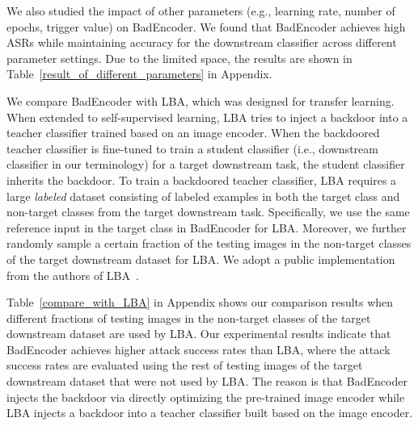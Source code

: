   We also studied the impact of other parameters (e.g., learning rate, number of epochs, trigger value) on BadEncoder. We found that BadEncoder achieves high ASRs while maintaining accuracy for the downstream classifier across different parameter settings. Due to the limited space, the results are shown in Table~\ref{result_of_different_parameters} in Appendix. 



 We compare BadEncoder with LBA, which was designed for transfer learning. When extended to self-supervised learning, LBA tries to inject a backdoor into a teacher classifier trained based on an image encoder. When the backdoored teacher classifier is fine-tuned to train a student classifier (i.e., downstream classifier in our terminology) for a target downstream task, the student classifier inherits the backdoor. To train a backdoored teacher classifier, LBA requires a large \emph{labeled} dataset consisting of {labeled} examples in both the target class and  non-target classes from the target downstream task. 
Specifically, we use the same reference input in the target class in BadEncoder for LBA. Moreover, we further randomly sample a certain fraction of the testing images in the non-target classes of the target downstream dataset for LBA. We adopt a public implementation from the authors of LBA~\cite{latent_url}. 



Table~\ref{compare_with_LBA} in Appendix shows our comparison results when different fractions of testing images in the non-target classes of the target downstream dataset are used by LBA. Our experimental results indicate that BadEncoder achieves higher attack success rates than LBA, where the attack success rates are evaluated using the rest of testing images of the target downstream dataset that were not used by LBA. The reason is that BadEncoder injects the backdoor via directly optimizing the pre-trained image encoder while LBA injects a backdoor into a teacher classifier built based on the image encoder.


